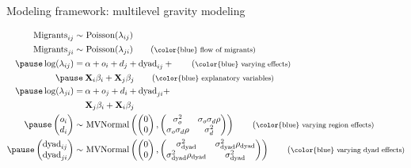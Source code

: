 \documentclass{beamer}
\begin{document}
\begin{frame}[fragile]{Modeling framework: multilevel gravity modeling}
\begin{small}
  \begin{align}
	\text{Migrants}_{ij} \sim & \text{ Poisson}(\lambda_{ij}) \notag \\
	\text{Migrants}_{ji} \sim & \text{ Poisson}(\lambda_{ji}) \tag{\footnotesize \color{blue} flow of migrants} \\ \pause
	\log(\lambda_{ij}) =  & \: \alpha + o_{i} + d_{j} + \text{dyad}_{ij} +\tag{\footnotesize
							\color{blue} varying effects}  \\ \pause
							  & \: \mathbf{X}_{i}  \beta_{i}+ \mathbf{X}_{j} \beta_{j}  \tag{\footnotesize \color{blue} explanatory variables}  \\ \pause
	\log(\lambda_{ji}) =  & \: \alpha + o_{j} + d_{i} + \text{dyad}_{ji} + \notag \\
							  & \: \mathbf{X}_{j}  \beta_{i}+ \mathbf{X}_{i} \beta_{j} \notag  \\ \pause
	\left(\begin{matrix} 
		o_{i} \\
		d_{i}
	\end{matrix}\right) \sim& \text{ MVNormal}\left( \left( \begin{matrix}
	0 \\
	0 
	\end{matrix}\right) , \left(\begin{matrix}
	\sigma_o^2 & \sigma_o \sigma_d \rho \\
	 \sigma_o \sigma_d \rho  & \sigma_d^2
	\end{matrix}\right) \right)  \tag{\footnotesize \color{blue} varying region effects}  \\ \pause 	\left(\begin{matrix} 
		\text{dyad}_{ij} \\
		\text{dyad}_{ji}
	\end{matrix}\right) \sim& \text{ MVNormal}\left( \left( \begin{matrix}
	0 \\
	0 
	\end{matrix}\right) , \left(\begin{matrix}
	\sigma_{\text{dyad}}^2 & \sigma_{\text{dyad}}^2 \rho_{\text{dyad}} \\
	 \sigma_{\text{dyad}}^2 \rho_{\text{dyad}}  & \sigma_{\text{dyad}}^2
	\end{matrix}\right) \right)  \tag{\footnotesize \color{blue} varying dyad effects}
	\end{align}
\end{small}
\end{frame}
\end{document}
